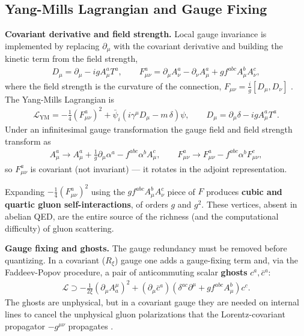 \subsection{Yang-Mills Lagrangian and Gauge Fixing}
\label{subsec:yang-mills-lagrangian-and-gauge-fixing}

\textbf{Covariant derivative and field strength.} Local gauge invariance is implemented by replacing $\partial_\mu$ with the covariant derivative and building the kinetic term from the field strength,
\begin{align}
    D_\mu = \partial_\mu - i g A_\mu^a T^a,
    \qquad
    F_{\mu\nu}^a = \partial_\mu A_\nu^a - \partial_\nu A_\mu^a + g f^{abc} A_\mu^b A_\nu^c,
\end{align}
where the field strength is the curvature of the connection, $F_{\mu\nu} = \tfrac{i}{g}[D_\mu, D_\nu]$ \autocite[(25.54),(26.2)]{schwartzQFT2014}. The Yang-Mills Lagrangian is
\begin{align}
    \label{eq:ym-lagrangian}
    \mathcal{L}_{\mathrm{YM}} = -\tfrac{1}{4}(F_{\mu\nu}^a)^2 + \bar\psi_i\left(i\gamma^\mu D_{\mu} - m\,\delta\right)\psi ,
    \qquad D_{\mu} = \partial_\mu\delta- i g A_\mu^a T^a.
\end{align}
Under an infinitesimal gauge transformation the gauge field and field strength transform as \autocite[(25.5)]{schwartzQFT2014}
\begin{align}
    A_\mu^a \to A_\mu^a + \tfrac{1}{g}\partial_\mu\alpha^a - f^{abc}\alpha^b A_\mu^c,
    \qquad
    F_{\mu\nu}^a \to F_{\mu\nu}^a - f^{abc}\alpha^b F_{\mu\nu}^c,
\end{align}
so $F_{\mu\nu}^a$ is covariant (not invariant) --- it rotates in the adjoint representation.

\begin{remark}
    Expanding $-\tfrac14(F_{\mu\nu}^a)^2$ using the $g f^{abc}A_\mu^b A_\nu^c$ piece of $F$ produces \textbf{cubic and quartic gluon self-interactions}, of orders $g$ and $g^2$. These vertices, absent in abelian QED, are the entire source of the richness (and the computational difficulty) of gluon scattering.
\end{remark}

\textbf{Gauge fixing and ghosts.} The gauge redundancy must be removed before quantizing. In a covariant ($R_\xi$) gauge one adds a gauge-fixing term and, via the Faddeev-Popov procedure, a pair of anticommuting scalar \textbf{ghosts} $c^a, \bar c^a$:
\begin{align}
    \mathcal{L} \supset -\frac{1}{2\xi}(\partial_\mu A^\mu_a)^2 + (\partial_\mu \bar c^a)(\delta^{ac}\partial^\mu + g f^{abc}A_\mu^b) c^c .
\end{align}
The ghosts are unphysical, but in a covariant gauge they are needed on internal lines to cancel the unphysical gluon polarizations that the Lorentz-covariant propagator $-g^{\mu\nu}$ propagates \autocite[\S25.4.3,\S26.1]{schwartzQFT2014}.

